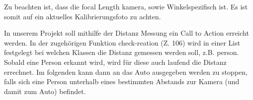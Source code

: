 Zu beachten ist, dass die focal Length kamera, sowie Winkelspezifisch ist. Es ist somit auf ein aktuelles Kalibrierungsfoto zu achten.

In unserem Projekt soll mithilfe der Distanz Messung ein Call to Action erreicht werden. In der zugehörigen Funktion check-reation (Z. 106) wird in einer List festgelegt bei welchen Klassen die Distanz gemessen werden soll, z.B. person. Sobald eine Person erkannt wird, wird für diese auch laufend die Distanz errechnet. Im folgenden kann dann an das Auto ausgegeben werden zu stoppen, falls sich eine Person unterhalb eines bestimmten Abstands zur Kamera (und damit zum Auto) befindet.